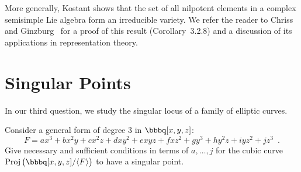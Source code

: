 More generally, Kostant shows that the set of all nilpotent elements
in a complex semisimple Lie algebra form an
irreducible variety.  We refer the reader to Chriss and
Ginzburg~\cite{SC:CV} for a proof of this result (Corollary~3.2.8) and
a discussion of its applications in representation theory.


\section{Singular Points}

In our third question, we study the singular locus of a family of elliptic curves.

\begin{problem*} 
Consider a general form of degree $3$ in $\bbbq[x,y,z]$:
\[
F = ax^{3} + bx^{2}y + cx^{2}z + dxy^{2} + exyz + fxz^{2} + gy^{3} +
hy^{2}z + iyz^{2} + jz^{3} \enspace .
\]
Give necessary and sufficient conditions in terms of $a, \ldots, j$
for the cubic curve $\Proj\big( \bbbq[x,y,z] / \langle F \rangle
\big)$ to have a singular point.
\end{problem*}

